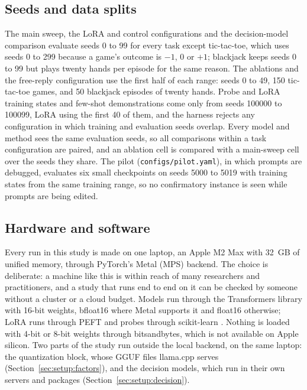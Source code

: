 \subsection{Seeds and data splits}
\label{sec:setup:seeds}

The main sweep, the LoRA and control configurations and the decision-model comparison evaluate seeds 0 to 99 for every task except tic-tac-toe, which uses seeds 0 to 299 because a game's outcome is $-1$, 0 or $+1$; blackjack keeps seeds 0 to 99 but plays twenty hands per episode for the same reason. The ablations and the free-reply configuration use the first half of each range: seeds 0 to 49, 150 tic-tac-toe games, and 50 blackjack episodes of twenty hands. Probe and LoRA training states and few-shot demonstrations come only from seeds 100000 to 100099, LoRA using the first 40 of them, and the harness rejects any configuration in which training and evaluation seeds overlap. Every model and method sees the same evaluation seeds, so all comparisons within a task configuration are paired, and an ablation cell is compared with a main-sweep cell over the seeds they share. The pilot (\texttt{configs/pilot.yaml}), in which prompts are debugged, evaluates six small checkpoints on seeds 5000 to 5019 with training states from the same training range, so no confirmatory instance is seen while prompts are being edited.

\subsection{Hardware and software}
\label{sec:setup:hw}

Every run in this study is made on one laptop, an Apple M2 Max with 32~GB of unified memory, through PyTorch's Metal (MPS) backend. The choice is deliberate: a machine like this is within reach of many researchers and practitioners, and a study that runs end to end on it can be checked by someone without a cluster or a cloud budget. Models run through the Transformers library \citep{wolf2020transformers} with 16-bit weights, bfloat16 where Metal supports it and float16 otherwise; LoRA runs through PEFT and probes through scikit-learn \citep{pedregosa2011scikit}. Nothing is loaded with 4-bit or 8-bit weights through bitsandbytes, which is not available on Apple silicon. Two parts of the study run outside the local backend, on the same laptop: the quantization block, whose GGUF files llama.cpp serves (Section~\ref{sec:setup:factors}), and the decision models, which run in their own servers and packages (Section~\ref{sec:setup:decision}).

